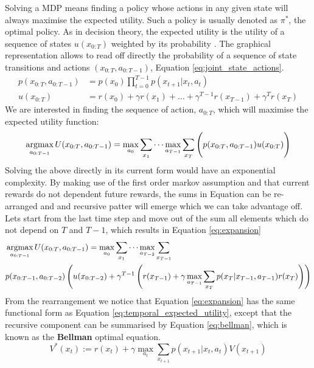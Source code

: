 Solving a MDP means finding a policy whose actions in any given state will always maximise the expected utility. Such 
a policy is usually denoted as $\pi^*$, the optimal policy. As in decision theory, the expected utility is the utility 
of  a sequence of states $u(x_{0:T})$ weighted by its probability . The graphical representation allows to read off directly the probability 
of a sequence of state transitions and actions $(x_{0:T},a_{0:T-1})$, Equation \ref{eq:joint_state_actions}.
\begin{align}\label{eq:joint_state_actions}
  p(x_{0:T},a_{0:T-1}) &= p(x_{0}) \prod_{t=0}^{T-1} p(x_{t+1}|x_t,a_t) \\
  u(x_{0:T}) 	       &= r(x_0) + \gamma r(x_1) + \dots + \gamma^{T-1} r(x_{T-1})  + \gamma^T r(x_T)
\end{align}
We are interested in finding the sequence of action, $a_{0:T}$, which will maximise the expected utility function:
\begin{equation}\label{eq:temporal_expected_utility}
 \argmax_{a_{0:T-1}} U(x_{0:T},a_{0:T-1}) = \max_{a_0} \sum\limits_{x_1}   \cdots  \max_{a_{T-1}} \sum\limits_{x_T} \Bigg( p(x_{0:T},a_{0:T-1}) u(x_{0:T}) \Bigg)
\end{equation}
Solving the above directly in its current form would have an exponential complexity. By making use of the first order 
markov assumption and that current rewards do not dependent future rewards, the sums in Equation \label{eq:max_util} can be re-arranged and 
and recursive patter will emerge which we can take advantage off. Lets start from the last time step and move out of the sum all elements 
which do not depend on $T$ and $T-1$, which results in Equation \ref{eq:expansion}
\begin{align}\label{eq:expansion}
 &\argmax_{a_{0:T-1}} U(x_{0:T},a_{0:T-1}) =\max_{a_0} \sum\limits_{x_1}   \cdots  \max_{a_{T-2}} \sum\limits_{x_{T-1}}  \nonumber\\
 &p(x_{0:T-1},a_{0:T-2})  \left( u(x_{0:T-2}) + \gamma^{T-1} \left( r(x_{T-1}) +  \gamma \max_{a_{T-1}} \sum\limits_{x_{T}} p(x_{T}|x_{T-1},a_{T-1}) r(x_{T}) \right) \right)
\end{align}
From the rearrangement we notice that Equation \ref{eq:expansion} has the same functional form as Equation \ref{eq:temporal_expected_utility}, 
except that the recursive component can be summarised by Equation \ref{eq:bellman}, which is known as 
the \textbf{Bellman} optimal equation.
\begin{equation}\label{eq:bellman}
 V^*(x_t) := r(x_t) + \gamma \max_{a_t} \sum\limits_{x_{t+1}} p(x_{t+1}|x_t,a_t) V(x_{t+1})
\end{equation}
